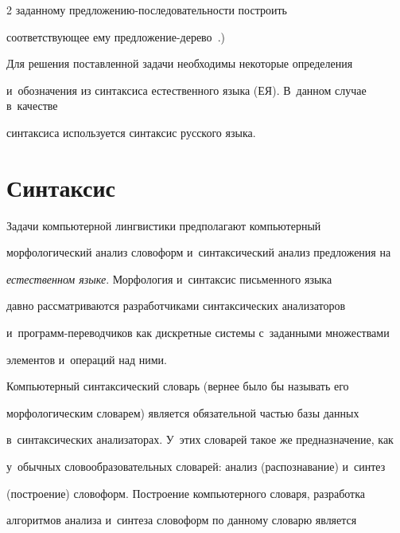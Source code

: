 \begin{multicols}{2}
заданному пред\-ло\-же\-нию-по\-сле\-до\-ва\-тель\-ности построить 


со\-от\-вет\-ст\-ву\-ющее ему пред\-ло\-же\-ние-де\-ре\-во~\cite{4-mir}.) 


     


     Для решения поставленной задачи необходимы некоторые определения 


и~обозначения из синтаксиса естественного языка (ЕЯ). В~данном случае в~качестве 


синтаксиса используется синтаксис русского языка.





\vspace*{-6pt}


     


\section{Синтаксис}





     Задачи компьютерной лингвистики предполагают компьютерный 


морфологический анализ словоформ и~синтаксический анализ предложения на 


\textit{естественном языке}. Морфология и~синтаксис письменного языка 


давно рас\-смат\-ри\-ва\-ют\-ся разработчиками синтаксических анализаторов 


и~про\-грамм-пе\-ре\-вод\-чи\-ков как дискретные сис\-те\-мы с~заданными множествами 


элементов и~операций над ними. 


      


     Компьютерный синтаксический словарь (вернее было бы называть его 


морфологическим словарем) является обязательной \mbox{частью} базы данных\linebreak 


в~синтаксических анализаторах. У~этих словарей такое же предназначение, как 


у~обычных словообразовательных словарей: анализ (распознавание) и~синтез 


(построение) словоформ. Построение компьютерного словаря, разработка 


алгоритмов анализа и~синтеза словоформ по данному словарю является 



\end{multicols}
